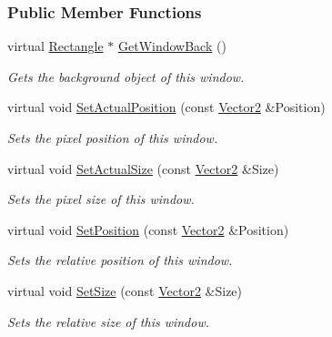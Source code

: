 \subsubsection*{Public Member Functions}
\begin{DoxyCompactItemize}
\item 
virtual \hyperlink{classMezzanine_1_1UI_1_1Rectangle}{Rectangle} $\ast$ \hyperlink{classMezzanine_1_1UI_1_1Window_adff05aa4e1e6cf1c17346544377281a2}{GetWindowBack} ()
\begin{DoxyCompactList}\small\item\em Gets the background object of this window. \item\end{DoxyCompactList}\item 
virtual void \hyperlink{classMezzanine_1_1UI_1_1Window_a79929aa37e9bb297ed3ae9c09ec42dee}{SetActualPosition} (const \hyperlink{classMezzanine_1_1Vector2}{Vector2} \&Position)
\begin{DoxyCompactList}\small\item\em Sets the pixel position of this window. \item\end{DoxyCompactList}\item 
virtual void \hyperlink{classMezzanine_1_1UI_1_1Window_adda80dca776a0de7468c7937c4653eec}{SetActualSize} (const \hyperlink{classMezzanine_1_1Vector2}{Vector2} \&Size)
\begin{DoxyCompactList}\small\item\em Sets the pixel size of this window. \item\end{DoxyCompactList}\item 
virtual void \hyperlink{classMezzanine_1_1UI_1_1Window_a8e25cd61721c2321f1117720e1af41a2}{SetPosition} (const \hyperlink{classMezzanine_1_1Vector2}{Vector2} \&Position)
\begin{DoxyCompactList}\small\item\em Sets the relative position of this window. \item\end{DoxyCompactList}\item 
virtual void \hyperlink{classMezzanine_1_1UI_1_1Window_a1816409c5c9d9f7bca38510270e340e3}{SetSize} (const \hyperlink{classMezzanine_1_1Vector2}{Vector2} \&Size)
\begin{DoxyCompactList}\small\item\em Sets the relative size of this window. \item\end{DoxyCompactList}\item 

\end{DoxyCompactItemize}
